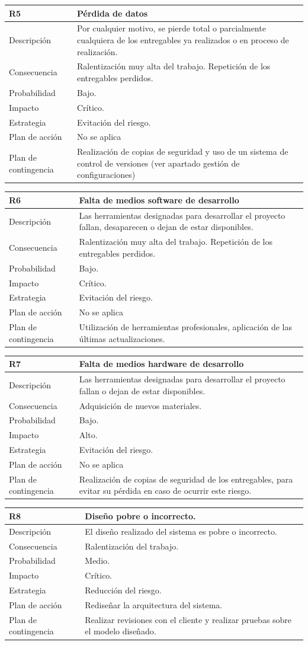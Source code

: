 \documentclass[twoside]{report}
\newcommand\addrow[2]{#1 &#2\\ }
\newcommand\addheading[2]{#1 &#2\\ \hline}
\newcommand\tabularhead{\begin{tabular}{lp{0.7\textwidth}}
\hline
}
\newenvironment{risk}{\tabularhead}
{\hline\end{tabular}}
\begin{document}
\begin{risk}
  \addheading{R5}{Pérdida de datos}
  \addrow{Descripción}{Por cualquier motivo, se pierde total o parcialmente cualquiera de los entregables ya realizados o en proceso de realización.}
  \addrow{Consecuencia}{Ralentización muy alta del trabajo. Repetición de los entregables perdidos. }
  \addrow{Probabilidad}{Bajo.}
  \addrow{Impacto}{Crítico. }
  \addrow{Estrategia}{Evitación del riesgo.}
  \addrow{Plan de acción}{No se aplica}
  \addrow{Plan de contingencia}{Realización de copias de seguridad y uso de un sistema de control de versiones (ver apartado gestión de configuraciones)}
\end{risk}

\begin{risk}
  \addheading{R6}{Falta de medios software de desarrollo}
  \addrow{Descripción}{Las herramientas designadas para desarrollar el proyecto fallan, desaparecen o dejan de estar disponibles.}
  \addrow{Consecuencia}{Ralentización muy alta del trabajo. Repetición de los entregables perdidos. }
  \addrow{Probabilidad}{Bajo.}
  \addrow{Impacto}{Crítico. }
  \addrow{Estrategia}{Evitación del riesgo.}
  \addrow{Plan de acción}{No se aplica}
  \addrow{Plan de contingencia}{Utilización de herramientas profesionales, aplicación de las últimas actualizaciones.}
\end{risk}

\begin{risk}
  \addheading{R7}{Falta de medios hardware de desarrollo}
  \addrow{Descripción}{Las herramientas designadas para desarrollar el proyecto fallan o dejan de estar disponibles.}
  \addrow{Consecuencia}{Adquisición de nuevos materiales.}
  \addrow{Probabilidad}{Bajo.}
  \addrow{Impacto}{Alto. }
  \addrow{Estrategia}{Evitación del riesgo.}
  \addrow{Plan de acción}{No se aplica}
  \addrow{Plan de contingencia}{Realización de copias de seguridad de los entregables, para evitar su pérdida en caso de ocurrir este riesgo.}
\end{risk}

\begin{risk}
  \addheading{R8}{Diseño pobre o incorrecto.} 
  \addrow{Descripción}{El diseño realizado del sistema es pobre o incorrecto.}
  \addrow{Consecuencia}{Ralentización del trabajo.}
  \addrow{Probabilidad}{Medio.}
  \addrow{Impacto}{Crítico. }
  \addrow{Estrategia}{Reducción del riesgo.}
  \addrow{Plan de acción}{Rediseñar la arquitectura del sistema.}
  \addrow{Plan de contingencia}{Realizar revisiones con el cliente y realizar pruebas sobre el modelo diseñado.}
\end{risk}
\end{document}
